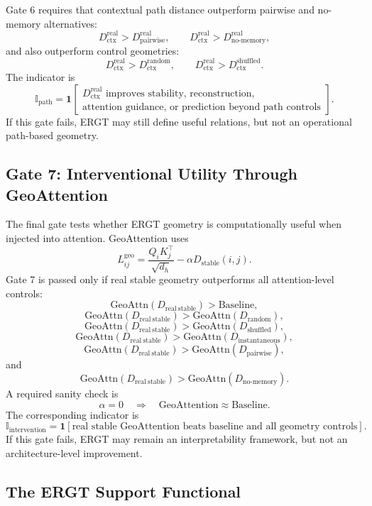 \documentclass[11pt]{article}
\begin{document}
Gate 6 requires that contextual path distance outperform pairwise and no-memory alternatives:
\[
D_{\mathrm{ctx}}^{\mathrm{real}}
>
D_{\mathrm{pairwise}}^{\mathrm{real}},
\qquad
D_{\mathrm{ctx}}^{\mathrm{real}}
>
D_{\mathrm{no\text{-}memory}}^{\mathrm{real}},
\]
and also outperform control geometries:
\[
D_{\mathrm{ctx}}^{\mathrm{real}}
>
D_{\mathrm{ctx}}^{\mathrm{random}},
\qquad
D_{\mathrm{ctx}}^{\mathrm{real}}
>
D_{\mathrm{ctx}}^{\mathrm{shuffled}}.
\]
The indicator is
\[
\mathbb{I}_{\mathrm{path}}
=
\mathbf{1}
\left[
\begin{array}{l}
D_{\mathrm{ctx}}^{\mathrm{real}}\text{ improves stability, reconstruction,}\\
\text{attention guidance, or prediction beyond path controls}
\end{array}
\right].
\]
If this gate fails, ERGT may still define useful relations, but not an operational path-based geometry.

\subsection{Gate 7: Interventional Utility Through GeoAttention}

The final gate tests whether ERGT geometry is computationally useful when injected into attention. GeoAttention uses
\[
L_{ij}^{\mathrm{geo}}
=
\frac{Q_iK_j^{\top}}{\sqrt{d_h}}
-
\alpha D_{\mathrm{stable}}(i,j).
\]
Gate 7 is passed only if real stable geometry outperforms all attention-level controls:
\[
\mathrm{GeoAttn}(D_{\mathrm{real\ stable}})
>
\mathrm{Baseline},
\]
\[
\mathrm{GeoAttn}(D_{\mathrm{real\ stable}})
>
\mathrm{GeoAttn}(D_{\mathrm{random}}),
\]
\[
\mathrm{GeoAttn}(D_{\mathrm{real\ stable}})
>
\mathrm{GeoAttn}(D_{\mathrm{shuffled}}),
\]
\[
\mathrm{GeoAttn}(D_{\mathrm{real\ stable}})
>
\mathrm{GeoAttn}(D_{\mathrm{instantaneous}}),
\]
\[
\mathrm{GeoAttn}(D_{\mathrm{real\ stable}})
>
\mathrm{GeoAttn}(D_{\mathrm{pairwise}}),
\]
and
\[
\mathrm{GeoAttn}(D_{\mathrm{real\ stable}})
>
\mathrm{GeoAttn}(D_{\mathrm{no\text{-}memory}}).
\]
A required sanity check is
\[
\alpha=0
\quad\Rightarrow\quad
\mathrm{GeoAttention}\approx\mathrm{Baseline}.
\]
The corresponding indicator is
\[
\mathbb{I}_{\mathrm{intervention}}
=
\mathbf{1}
\left[
\text{real stable GeoAttention beats baseline and all geometry controls}
\right].
\]
If this gate fails, ERGT may remain an interpretability framework, but not an architecture-level improvement.

\subsection{The ERGT Support Functional}
\end{document}
